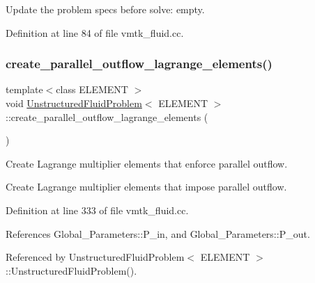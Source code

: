 Update the problem specs before solve\+: empty. 



Definition at line 84 of file vmtk\+\_\+fluid.\+cc.

\mbox{\label{classUnstructuredFluidProblem_aea2fa32b4dd90aab81da540566b9925a}} 
\subsubsection{\texorpdfstring{create\+\_\+parallel\+\_\+outflow\+\_\+lagrange\+\_\+elements()}{create\_parallel\_outflow\_lagrange\_elements()}}
{\footnotesize\ttfamily template$<$class E\+L\+E\+M\+E\+NT $>$ \\
void \hyperlink{classUnstructuredFluidProblem}{Unstructured\+Fluid\+Problem}$<$ E\+L\+E\+M\+E\+NT $>$\+::create\+\_\+parallel\+\_\+outflow\+\_\+lagrange\+\_\+elements (\begin{DoxyParamCaption}{ }\end{DoxyParamCaption})\hspace{0.3cm}{\ttfamily [private]}}



Create Lagrange multiplier elements that enforce parallel outflow. 

Create Lagrange multiplier elements that impose parallel outflow. 

Definition at line 333 of file vmtk\+\_\+fluid.\+cc.



References Global\+\_\+\+Parameters\+::\+P\+\_\+in, and Global\+\_\+\+Parameters\+::\+P\+\_\+out.



Referenced by Unstructured\+Fluid\+Problem$<$ E\+L\+E\+M\+E\+N\+T $>$\+::\+Unstructured\+Fluid\+Problem().

\mbox{\label{classUnstructuredFluidProblem_abcc9f0065665ae5239988b1a812e3f78}} 
